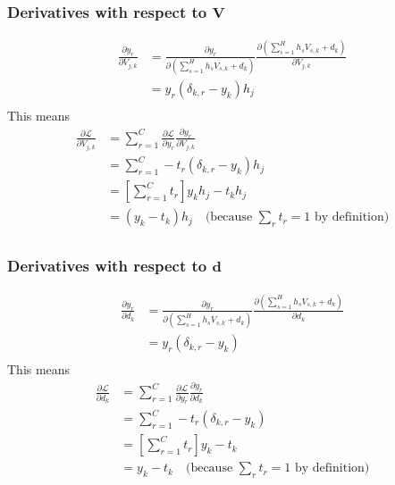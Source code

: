 \documentclass{article}
\begin{document}
\subsubsection*{Derivatives with respect to $\mathbf{V}$}
\begin{equation}
\begin{split}
    \frac{\partial y_r}{\partial V_{j,k}}
    &= \frac{\partial y_r}{\partial (\sum_{s=1}^H h_s V_{s,k} + d_k)}
       \frac{\partial(\sum_{s=1}^H h_s V_{s,k} + d_k)}{\partial V_{j,k}} \\
    &= y_r (\delta_{k,r} - y_k) h_j \\
\end{split}
\end{equation}
This means
\begin{equation}
\begin{split}
    \frac{\partial \mathcal{L}}{\partial V_{j,k}}
    &= \sum_{r=1}^C \frac{\partial \mathcal{L}}{\partial y_r}
                    \frac{\partial y_r}{\partial V_{j,k}} \\
    &= \sum_{r=1}^C -t_r (\delta_{k,r} - y_k) h_j \\
    &= \left[\sum_{r=1}^C t_r \right]y_k h_j - t_k h_j\\
    &= (y_k - t_k)h_j \quad \textrm{(because $\sum_r t_r
       = 1$ by definition)} \\
\end{split}
\end{equation}

\subsubsection*{Derivatives with respect to $\mathbf{d}$}
\begin{equation}
\begin{split}
    \frac{\partial y_r}{\partial d_k}
    &= \frac{\partial y_r}{\partial (\sum_{s=1}^H h_s V_{s,k} + d_k)}
       \frac{\partial(\sum_{s=1}^H h_s V_{s,k} + d_k)}{\partial d_k} \\
    &= y_r (\delta_{k,r} - y_k) \\
\end{split}
\end{equation}
This means
\begin{equation}
\begin{split}
    \frac{\partial \mathcal{L}}{\partial d_k}
    &= \sum_{r=1}^C \frac{\partial \mathcal{L}}{\partial y_r}
                    \frac{\partial y_r}{\partial d_k} \\
    &= \sum_{r=1}^C -t_r (\delta_{k,r} - y_k)\\
    &= \left[\sum_{r=1}^C t_r \right]y_k - t_k \\
    &= y_k - t_k \quad \textrm{(because $\sum_r t_r = 1$ by definition)} \\
\end{split}
\end{equation}
\end{document}
